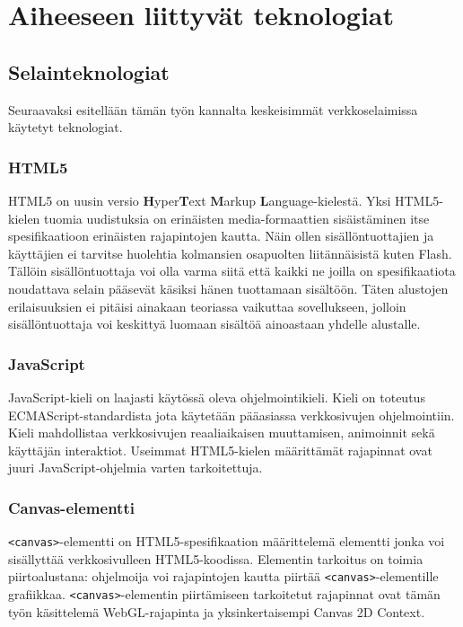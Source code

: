 \section{Aiheeseen liittyvät teknologiat}
\label{sec:taustaa}

\subsection{Selainteknologiat}
Seuraavaksi esitellään tämän työn kannalta keskeisimmät verkkoselaimissa käytetyt teknologiat. 

\subsubsection{HTML5}
HTML5 on uusin versio \textbf{H}yper\textbf{T}ext \textbf{M}arkup \textbf{L}anguage-kielestä\cite{htmlapis}. Yksi HTML5-kielen tuomia uudistuksia on erinäisten media-formaattien sisäistäminen itse spesifikaatioon erinäisten rajapintojen kautta\cite{html5diff}. Näin ollen sisällöntuottajien ja käyttäjien ei tarvitse huolehtia kolmansien osapuolten liitännäisistä kuten Flash. Tällöin sisällöntuottaja voi olla varma siitä että kaikki ne joilla on spesifikaatiota noudattava selain pääsevät käsiksi hänen tuottamaan sisältöön. Täten alustojen erilaisuuksien ei pitäisi ainakaan teoriassa vaikuttaa sovellukseen, jolloin sisällöntuottaja voi keskittyä luomaan sisältöä ainoastaan yhdelle alustalle.

\subsubsection{JavaScript}
JavaScript-kieli on laajasti käytössä oleva ohjelmointikieli. Kieli on toteutus ECMAScript-standardista\cite{ecmascript} jota käytetään pääasiassa verkkosivujen ohjelmointiin\cite{mdnjs}. Kieli mahdollistaa verkkosivujen reaaliaikaisen muuttamisen, animoinnit sekä käyttäjän interaktiot. Useimmat HTML5-kielen määrittämät rajapinnat ovat juuri JavaScript-ohjelmia varten tarkoitettuja.

\subsubsection{Canvas-elementti}
\texttt{<canvas>}-elementti on HTML5-spesifikaation määrittelemä elementti jonka voi sisällyttää verkkosivulleen HTML5-koodissa. Elementin tarkoitus on toimia piirtoalustana: ohjelmoija voi rajapintojen kautta piirtää \texttt{<canvas>}-elementille grafiikkaa. \texttt{<canvas>}-elementin piirtämiseen tarkoitetut rajapinnat ovat tämän työn käsittelemä WebGL-rajapinta ja yksinkertaisempi Canvas 2D Context.\cite{canvas_spec}

